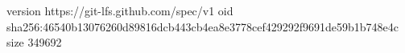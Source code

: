 version https://git-lfs.github.com/spec/v1
oid sha256:46540b13076260d89816dcb443cb4ea8e3778cef429292f9691de59b1b748e4c
size 349692
